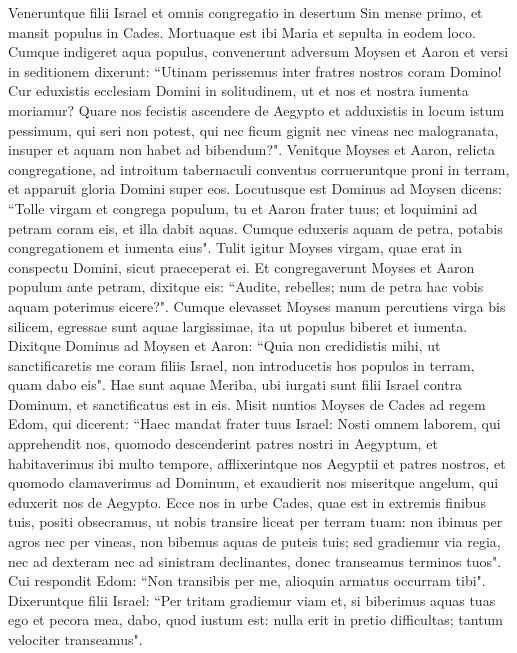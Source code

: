 \begin{biblechapter}  
\verse Veneruntque filii Israel et omnis congregatio in desertum Sin mense primo, et mansit populus in Cades. Mortuaque est ibi Maria et sepulta in eodem loco. 
\verse Cumque indigeret aqua populus, convenerunt adversum Moysen et Aaron 
\verse et versi in seditionem dixerunt: “Utinam perissemus inter fratres nostros coram Domino! 
\verse Cur eduxistis ecclesiam Domini in solitudinem, ut et nos et nostra iumenta moriamur? 
\verse Quare nos fecistis ascendere de Aegypto et adduxistis in locum istum pessimum, qui seri non potest, qui nec ficum gignit nec vineas nec malogranata, insuper et aquam non habet ad bibendum?". 
\verse Venitque Moyses et Aaron, relicta congregatione, ad introitum tabernaculi conventus corrueruntque proni in terram, et apparuit gloria Domini super eos.  
\verse Locutusque est Dominus ad Moysen dicens: 
\verse “Tolle virgam et congrega populum, tu et Aaron frater tuus; et loquimini ad petram coram eis, et illa dabit aquas. Cumque eduxeris aquam de petra, potabis congregationem et iumenta eius". 
\verse Tulit igitur Moyses virgam, quae erat in conspectu Domini, sicut praeceperat ei. 
\verse Et congregaverunt Moyses et Aaron populum ante petram, dixitque eis: “Audite, rebelles; num de petra hac vobis aquam poterimus eicere?". 
\verse Cumque elevasset Moyses manum percutiens virga bis silicem, egressae sunt aquae largissimae, ita ut populus biberet et iumenta. 
\verse Dixitque Dominus ad Moysen et Aaron: “Quia non credidistis mihi, ut sanctificaretis me coram filiis Israel, non introducetis hos populos in terram, quam dabo eis". 
\verse Hae sunt aquae Meriba, ubi iurgati sunt filii Israel contra Dominum, et sanctificatus est in eis. 
\verse Misit nuntios Moyses de Cades ad regem Edom, qui dicerent: “Haec mandat frater tuus Israel: Nosti omnem laborem, qui apprehendit nos, 
\verse quomodo descenderint patres nostri in Aegyptum, et habitaverimus ibi multo tempore, afflixerintque nos Aegyptii et patres nostros, 
\verse et quomodo clamaverimus ad Dominum, et exaudierit nos miseritque angelum, qui eduxerit nos de Aegypto. Ecce nos in urbe Cades, quae est in extremis finibus tuis, positi 
\verse obsecramus, ut nobis transire liceat per terram tuam: non ibimus per agros nec per vineas, non bibemus aquas de puteis tuis; sed gradiemur via regia, nec ad dexteram nec ad sinistram declinantes, donec transeamus terminos tuos". 
\verse Cui respondit Edom: “Non transibis per me, alioquin armatus occurram tibi". 
\verse Dixeruntque filii Israel: “Per tritam gradiemur viam et, si biberimus aquas tuas ego et pecora mea, dabo, quod iustum est: nulla erit in pretio difficultas; tantum velociter transeamus". 

\end{biblechapter}
